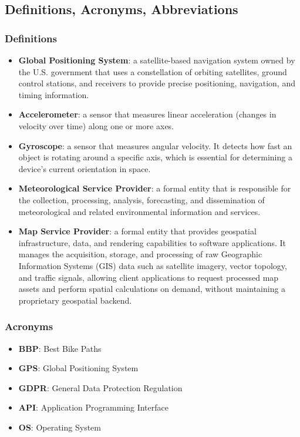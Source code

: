 \documentclass{article}
\begin{document}
\subsection{Definitions, Acronyms, Abbreviations}
\subsubsection{Definitions}
\begin{itemize}
    \item \textbf{Global Positioning System}: a satellite-based navigation system owned by the U.S. government that uses a constellation of orbiting satellites, ground control stations, and receivers to provide precise positioning, navigation, and timing information.
    \item \textbf{Accelerometer}: a sensor that measures linear acceleration (changes in velocity over time) along one or more axes.
    \item \textbf{Gyroscope}: a sensor that measures angular velocity. It detects how fast an object is rotating around a specific axis, which is essential for determining a device's current orientation in space.
    \item \textbf{Meteorological Service Provider}: a formal entity that is responsible for the collection, processing, analysis, forecasting, and dissemination of meteorological and related environmental information and services.
    \item \textbf{Map Service Provider}: a formal entity that provides geospatial infrastructure, data, and rendering capabilities to software applications. It manages the acquisition, storage, and processing of raw Geographic Information Systems (GIS) data such as satellite imagery, vector topology, and traffic signals, allowing client applications to request processed map assets and perform spatial calculations on demand, without maintaining a proprietary geospatial backend.
\end{itemize}

\subsubsection{Acronyms}
\begin{itemize}
    \item \textbf{BBP}: Best Bike Paths
    \item \textbf{GPS}: Global Positioning System
    \item \textbf{GDPR}: General Data Protection Regulation
    \item \textbf{API}: Application Programming Interface
    \item \textbf{OS}: Operating System
\end{itemize}
\end{document}
